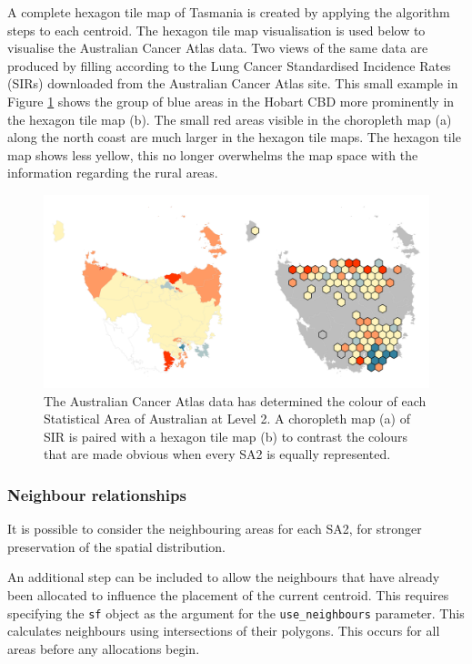 \documentclass{monashthesis}
\begin{document}
A complete hexagon tile map of Tasmania is created by applying the algorithm steps to each centroid.
The hexagon tile map visualisation is used below to visualise the Australian Cancer Atlas data. Two views of the same data are produced by filling according to the Lung Cancer Standardised Incidence Rates (SIRs) downloaded from the Australian Cancer Atlas site. This small example in Figure \ref{fig:sir} shows the group of blue areas in the Hobart CBD more prominently in the hexagon tile map (b).
The small red areas visible in the choropleth map (a) along the north coast are much larger in the hexagon tile maps. The hexagon tile map shows less yellow, this no longer overwhelms the map space with the information regarding the rural areas.

\begin{figure}[H]
\centering
\includegraphics[width=14cm]{figures/03-algorithm/7SIR.png}
\caption{\label{fig:sir}The Australian Cancer Atlas data has determined the colour of each Statistical Area of Australian at Level 2. A choropleth map (a) of SIR is paired with a hexagon tile map (b) to contrast the colours that are made obvious when every SA2 is equally represented.}
\end{figure}

\hypertarget{neighbour-relationships}{%
\subsubsection{Neighbour relationships}\label{neighbour-relationships}}

It is possible to consider the neighbouring areas for each SA2, for stronger preservation of the spatial distribution.

An additional step can be included to allow the neighbours that have already been allocated to influence the placement of the current centroid.
This requires specifying the \texttt{sf} object as the argument for the \texttt{use\_neighbours} parameter. This calculates neighbours using intersections of their polygons. This occurs for all areas before any allocations begin.
\end{document}
